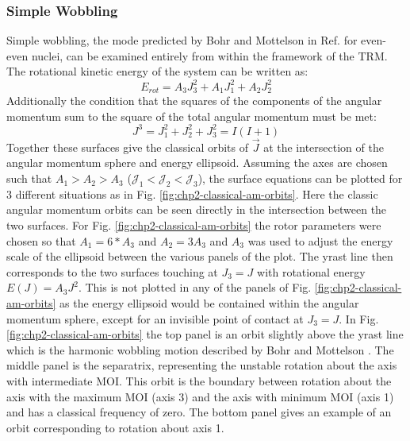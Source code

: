 \subsubsection{Simple Wobbling}
\label{sssec:models-wobbling-simple-wobbling}
Simple wobbling, the mode predicted by Bohr and Mottelson in Ref. \cite{bohrMottelson2} for even-even nuclei, can be examined entirely from within the framework of the TRM. The rotational kinetic energy of the system can be written as:
\begin{equation}
\label{eqn:chp2-rot-kin-en}
E_{rot} = A_3J_3^2 + A_1J_1^2 + A_2J_2^2
\end{equation}
Additionally the condition that the squares of the components of the angular momentum sum to the square of the total angular momentum must be met:
\begin{equation}
\label{eqn:chp2-am-cons}
J^3 = J_1^2 + J_2^2 + J_3^2 = I(I+1)
\end{equation}
Together these surfaces give the classical orbits of $\vec{J}$ at the intersection of the angular momentum sphere and energy ellipsoid. Assuming the axes are chosen such that $A_1>A_2>A_3$ ($\mathcal{J}_1<\mathcal{J}_2<\mathcal{J}_3$), the surface equations can be plotted for 3 different situations as in Fig. \ref{fig:chp2-classical-am-orbits}. Here the classic angular momentum orbits can be seen directly in the intersection between the two surfaces. For Fig. \ref{fig:chp2-classical-am-orbits} the rotor parameters were chosen so that $A_1=6*A_3$ and $A_2=3A_3$ and $A_3$ was used to adjust the energy scale of the ellipsoid between the various panels of the plot. The yrast line then corresponds to the two surfaces touching at $J_3=J$ with rotational energy $E(J)=A_3J^2$. This is not plotted in any of the panels of Fig. \ref{fig:chp2-classical-am-orbits} as the energy ellipsoid would be contained within the angular momentum sphere, except for an invisible point of contact at $J_3=J$. In Fig. \ref{fig:chp2-classical-am-orbits} the top panel is an orbit slightly above the yrast line which is the harmonic wobbling motion described by Bohr and Mottelson \cite{bohrMottelson2}. The middle panel is the separatrix, representing the unstable rotation about the axis with intermediate MOI. This orbit is the boundary between rotation about the axis with the maximum MOI (axis 3) and the axis with minimum MOI (axis 1) and has a classical frequency of zero. The bottom panel gives an example of an orbit corresponding to rotation about axis 1.
